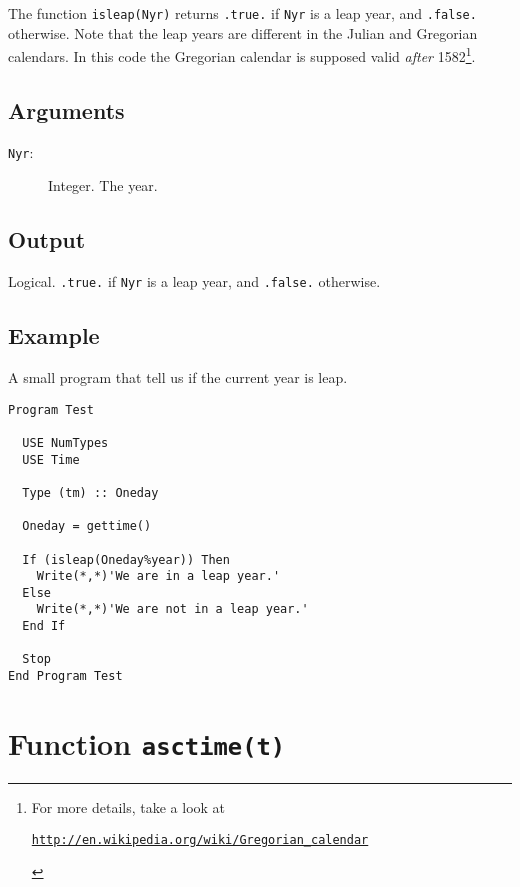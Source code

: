The function \texttt{isleap(Nyr)} returns \texttt{.true.} if \texttt{Nyr}
is a leap year, and \texttt{.false.} otherwise. Note that the leap
years are different in the Julian and Gregorian calendars. In this
code the Gregorian calendar is supposed valid \emph{after} 1582\footnote{For
more details, take a look at 
\begin{center}
\href{http://en.wikipedia.org/wiki/Gregorian_calendar}{\texttt{http://en.wikipedia.org/wiki/Gregorian\_calendar}}  
\end{center}
}. 

\subsection{Arguments}

\begin{description}
\item[\texttt{Nyr}: ] Integer. The year.
\end{description}

\subsection{Output}

Logical.  \texttt{.true.} if \texttt{Nyr} is a leap year, and
\texttt{.false.} otherwise. 

\subsection{Example}

A small program that tell us if the current year is leap.

\begin{verbatim}
Program Test

  USE NumTypes
  USE Time

  Type (tm) :: Oneday

  Oneday = gettime()

  If (isleap(Oneday%year)) Then
    Write(*,*)'We are in a leap year.'
  Else
    Write(*,*)'We are not in a leap year.'
  End If

  Stop
End Program Test
\end{verbatim}

\section{Function \texttt{asctime(t)}}

